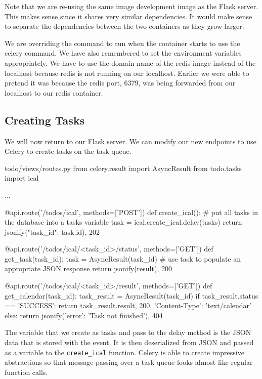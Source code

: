 \documentclass{csse4400}
\begin{document}
Note that we are re-using the same image development image as the Flask server.
This makes sense since it shares very similar dependencies.
It would make sense to separate the dependencies between the two containers as they grow larger.

We are overriding the command to run when the container starts to use the celery command.
We have also remembered to set the environment variables appropriately.
We have to use the domain name of the redis image instead of the localhost because redis is not running on our localhost.
Earlier we were able to pretend it was because the redis port, 6379, was being forwarded from our localhost to our redis container.

\subsection{Creating Tasks}

We will now return to our Flask server.
We can modify our new endpoints to use Celery to create tasks on the task queue.

\begin{code}[language=python,numbers=none]{todo/views/routes.py}
from celery.result import AsyncResult
from todo.tasks import ical

...

@api.route('/todos/ical', methods=['POST'])
def create_ical():
    # put all tasks in the database into a tasks variable
    task = ical.create_ical.delay(tasks)
    return jsonify({"task_id": task.id}), 202

@api.route('/todos/ical/<task_id>/status', methods=['GET'])
def get_task(task_id):
    task = AsyncResult(task_id)
    # use task to populate an appropriate JSON response
    return jsonify(result), 200

@api.route('/todos/ical/<task_id>/result', methods=['GET'])
def get_calendar(task_id):
    task_result = AsyncResult(task_id)
    if task_result.status == 'SUCCESS':
        return task_result.result, 200, {'Content-Type': 'text/calendar'}
    else:
        return jsonify({'error': 'Task not finished'}), 404
\end{code}

The variable that we create as tasks and pass to the delay method is the JSON data that is stored with the event.
It is then deserialized from JSON and passed as a variable to the \texttt{create\_ical} function.
Celery is able to create impressive abstractions so that message passing over a task queue looks almost like regular function calls.
\end{document}
